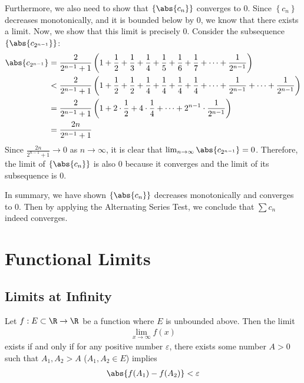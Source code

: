 \documentclass[thmcnt=section, 12pt]{elegantbook}
\begin{document}
\begin{example}
    \par Furthermore, we also need to show that $\left\{\abs{c_n}\right\}$ converges to $0$. Since $\left\{c_n\right\}$ decreases monotonically, and it is bounded below by $0$, we know that there exists a limit. Now, we show that this limit is precisely $0$. Consider the subsequence $\left\{\abs{c_{2^{n-1}}}\right\}$:
    \begin{align*}
        \abs{c_{2^{n-1}}}
        &= \frac{2}{2^{n-1} + 1} \left( 1 + \frac{1}{2} + \frac{1}{3} + \frac{1}{4} + \frac{1}{5} + \frac{1}{6} + \frac{1}{7} + \cdots + \frac{1}{2^{n-1}} \right) \\ 
        &< \frac{2}{2^{n-1} + 1} \left( 1 
        + \frac{1}{2} + \frac{1}{2} 
        + \frac{1}{4} + \frac{1}{4} + \frac{1}{4} + \frac{1}{4} + \cdots 
        + \frac{1}{2^{n-1}} + \cdots + \frac{1}{2^{n-1}} \right) \\ 
        &= \frac{2}{2^{n-1} + 1} \left( 1 
        + 2 \cdot \frac{1}{2}
        + 4 \cdot \frac{1}{4} 
        + \cdots 
        + 2^{n-1} \cdot \frac{1}{2^{n-1}} \right) \\
        &= \frac{2n}{2^{n-1} + 1}
    \end{align*}
    Since $\frac{2n}{2^{n-1} + 1} \to 0$ as $n \to \infty$, it is clear that $\lim_{n \to \infty} \abs{c_{2^{n-1}}} = 0$. Therefore, the limit of $\left\{\abs{c_n}\right\}$ is also $0$ because it converges and the limit of its subsequence is $0$.

    \par In summary, we have shown $\left\{\abs{c_n}\right\}$ decreases monotonically and converges to $0$. Then by applying the Alternating Series Test, we conclude that $\sum c_n$ indeed converges.
\end{example}



\chapter{Functional Limits}


\section{Limits at Infinity}


\begin{proposition} \label{pro:6}
    Let $f: E \subset \R \to \R$ be a function where $E$ is unbounded above. Then the limit
    \begin{align*}
        \lim_{x \to \infty} f(x)
    \end{align*}
    exists if and only if for any positive number $\varepsilon$, there exists some number $A > 0$ such that $A_1, A_2 > A$ ($A_1, A_2 \in E$) implies 
    \begin{align*}
        \abs{f(A_1) - f(A_2)} < \varepsilon
    \end{align*}
\end{proposition}
\end{document}
